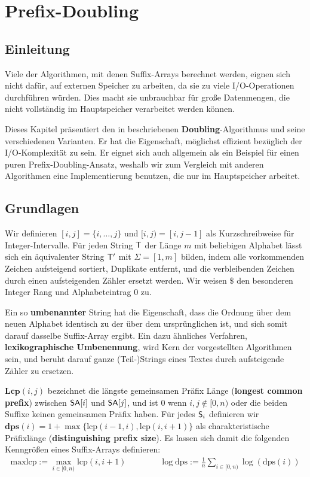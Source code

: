\section{Prefix-Doubling}

\subsection{Einleitung}

Viele  der Algorithmen, mit denen Suffix-Arrays berechnet werden, eignen sich nicht dafür, auf externen Speicher zu arbeiten, da sie zu viele I/O-Operationen durchführen würden. Dies macht sie unbrauchbar für große Datenmengen, die nicht vollständig im Hauptspeicher verarbeitet werden können.

Dieses Kapitel präsentiert den in \cite{saca:11} beschriebenen \textbf{Doubling}-Algorithmus und seine verschiedenen Varianten. Er hat die Eigenschaft, möglichst effizient bezüglich der I/O-Komplexität zu sein. Er eignet sich auch allgemein als ein Beispiel für einen puren Prefix-Doubling-Ansatz, weshalb wir zum Vergleich mit anderen Algorithmen eine Implementierung benutzen, die nur im Hauptspeicher arbeitet.

\subsection{Grundlagen}

Wir definieren $[i, j] = \{i, \dots, j\}$ und $[i, j) = [i, j - 1]$ als Kurzschreibweise für Integer-Intervalle. Für jeden String $\inputtext$ der Länge $m$ mit beliebigen Alphabet lässt sich ein äquivalenter String $\inputtext'$ mit $\Sigma = [1, m]$ bilden, indem alle vorkommenden Zeichen aufsteigend sortiert, Duplikate entfernt, und die verbleibenden Zeichen durch einen aufsteigenden Zähler ersetzt werden. Wir weisen $\$$ den besonderen Integer Rang und Alphabeteintrag $0$ zu.

Ein so \textbf{umbenannter} String hat die Eigenschaft, dass die Ordnung über dem neuen Alphabet identisch zu der über dem ursprünglichen ist, und sich somit darauf dasselbe Suffix-Array ergibt. Ein dazu ähnliches Verfahren, \textbf{lexikographische Umbenennung}, wird Kern der vorgestellten Algorithmen sein, und beruht darauf ganze (Teil-)Strings eines Textes durch aufsteigende Zähler zu ersetzen.

$\textbf{Lcp}(i, j)$ bezeichnet die längste gemeinsamen Präfix Länge (\textbf{longest common prefix}) zwischen $\sa[i]$ und $\sa[j]$, und ist $0$ wenn $i, j \notin [0, n)$ oder die beiden Suffixe keinen gemeinsamen Präfix haben. Für jedes $\mathsf{S}_{i}$ definieren wir $\textbf{dps}(i) = 1 + \max\{\text{lcp}(i - 1, i), \text{lcp}(i, i + 1)\}$ als charakteristische Präfixlänge (\textbf{distinguishing prefix size}). Es lassen sich damit die folgenden Kenngrößen eines Suffix-Arrays definieren:
\begin{gather*}
\text{maxlcp} := \max_{i \in [0, n)} \text{lcp}(i, i + 1) 
\qquad\qquad
\log \text{dps} := \frac{1}{n} \sum_{i \in [0, n)} \log(\text{dps}(i))
\end{gather*}

